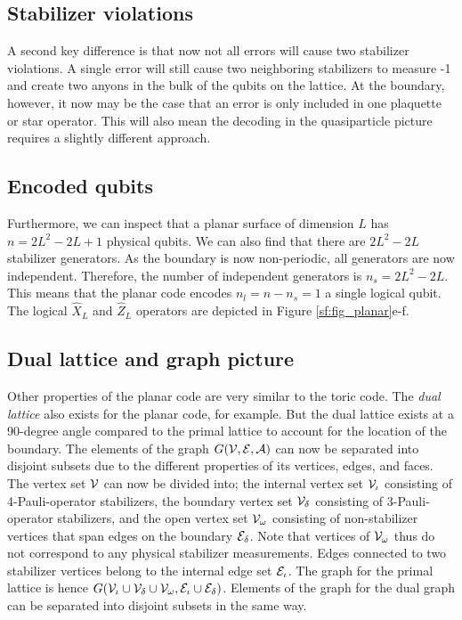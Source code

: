 \subsection{Stabilizer violations}
A second key difference is that now not all errors will cause two stabilizer violations. A single error will still cause two neighboring stabilizers to measure -1 and create two anyons in the bulk of the qubits on the lattice. At the boundary, however, it now may be the case that an error is only included in one plaquette or star operator. This will also mean the decoding in the quasiparticle picture requires a slightly different approach.

\subsection{Encoded qubits}
Furthermore, we can inspect that a planar surface of dimension $L$ has $n = 2L^2-2L+1$ physical qubits. We can also find that there are $2L^2-2L$ stabilizer generators. As the boundary is now non-periodic, all generators are now independent. Therefore, the number of independent generators is $n_s = 2L^2-2L$. This means that the planar code encodes $n_l = n-n_s = 1$ a single logical qubit. The logical $\hat{X}_L$ and $\hat{Z}_L$ operators are depicted in Figure \ref{sf:fig_planar}e-f.

\subsection{Dual lattice and graph picture}
Other properties of the planar code are very similar to the toric code. The \emph{dual lattice} also exists for the planar code, for example. But the dual lattice exists at a 90-degree angle compared to the primal lattice to account for the location of the boundary. The elements of the graph $G(\mathcal{V},\mathcal{E},\mathcal{A})$ can now be separated into disjoint subsets due to the different properties of its vertices, edges, and faces. The vertex set $\mathcal{V}$ can now be divided into; the internal vertex set $\mathcal{V}_\iota$ consisting of 4-Pauli-operator stabilizers, the boundary vertex set $\mathcal{V}_{\delta}$ consisting of 3-Pauli-operator stabilizers, and the open vertex set $\mathcal{V}_\omega$ consisting of non-stabilizer vertices that span edges on the boundary $\mathcal{E}_{\delta}$. Note that vertices of $\mathcal{V}_\omega$ thus do not correspond to any physical stabilizer measurements. Edges connected to two stabilizer vertices belong to the internal edge set $\mathcal{E}_\iota$. The graph for the primal lattice is hence $G(\mathcal{V}_\iota\cup \mathcal{V}_\delta \cup \mathcal{V}_\omega, \mathcal{E}_\iota\cup \mathcal{E}_\delta)$. Elements of the graph for the dual graph can be separated into disjoint subsets in the same way.


